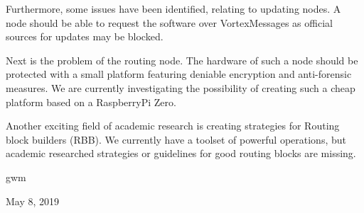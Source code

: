 \documentclass[10pt,journal,compsoc]{IEEEtran}
\let\MYoriglatexcaption\caption
\renewcommand{\caption}[2][\relax]{\MYoriglatexcaption[#2]{#2}}
\begin{document}
Furthermore, some issues have been identified, relating to updating nodes. A node should be able to request the software over VortexMessages as official sources for updates may be blocked. 

Next is the problem of the routing node. The hardware of such a node should be protected with a small platform featuring deniable encryption and anti-forensic measures. We are currently investigating the possibility of creating such a cheap platform based on a RaspberryPi Zero.

Another exciting field of academic research is creating strategies for Routing block builders (RBB). We currently have a toolset of powerful operations, but academic researched strategies or guidelines for good routing blocks are missing. 

\hfill gwm
 
\hfill May 8, 2019





%
%
\end{document}
